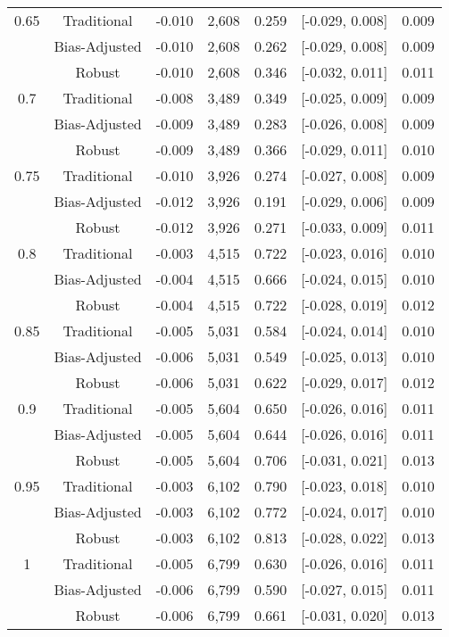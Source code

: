 \documentclass[
  12pt,
]{article}
\begin{document}
\begin{longtable}[t]{ccccccc}
0.65 & Traditional & -0.010 & 2,608 & 0.259 & {}[-0.029, 0.008] & 0.009\\
 & Bias-Adjusted & -0.010 & 2,608 & 0.262 & {}[-0.029, 0.008] & 0.009\\
 & Robust & -0.010 & 2,608 & 0.346 & {}[-0.032, 0.011] & 0.011\\
0.7 & Traditional & -0.008 & 3,489 & 0.349 & {}[-0.025, 0.009] & 0.009\\
 & Bias-Adjusted & -0.009 & 3,489 & 0.283 & {}[-0.026, 0.008] & 0.009\\
 & Robust & -0.009 & 3,489 & 0.366 & {}[-0.029, 0.011] & 0.010\\
0.75 & Traditional & -0.010 & 3,926 & 0.274 & {}[-0.027, 0.008] & 0.009\\
 & Bias-Adjusted & -0.012 & 3,926 & 0.191 & {}[-0.029, 0.006] & 0.009\\
 & Robust & -0.012 & 3,926 & 0.271 & {}[-0.033, 0.009] & 0.011\\
0.8 & Traditional & -0.003 & 4,515 & 0.722 & {}[-0.023, 0.016] & 0.010\\
 & Bias-Adjusted & -0.004 & 4,515 & 0.666 & {}[-0.024, 0.015] & 0.010\\
 & Robust & -0.004 & 4,515 & 0.722 & {}[-0.028, 0.019] & 0.012\\
0.85 & Traditional & -0.005 & 5,031 & 0.584 & {}[-0.024, 0.014] & 0.010\\
 & Bias-Adjusted & -0.006 & 5,031 & 0.549 & {}[-0.025, 0.013] & 0.010\\
 & Robust & -0.006 & 5,031 & 0.622 & {}[-0.029, 0.017] & 0.012\\
0.9 & Traditional & -0.005 & 5,604 & 0.650 & {}[-0.026, 0.016] & 0.011\\
 & Bias-Adjusted & -0.005 & 5,604 & 0.644 & {}[-0.026, 0.016] & 0.011\\
 & Robust & -0.005 & 5,604 & 0.706 & {}[-0.031, 0.021] & 0.013\\
0.95 & Traditional & -0.003 & 6,102 & 0.790 & {}[-0.023, 0.018] & 0.010\\
 & Bias-Adjusted & -0.003 & 6,102 & 0.772 & {}[-0.024, 0.017] & 0.010\\
 & Robust & -0.003 & 6,102 & 0.813 & {}[-0.028, 0.022] & 0.013\\
1 & Traditional & -0.005 & 6,799 & 0.630 & {}[-0.026, 0.016] & 0.011\\
 & Bias-Adjusted & -0.006 & 6,799 & 0.590 & {}[-0.027, 0.015] & 0.011\\
 & Robust & -0.006 & 6,799 & 0.661 & {}[-0.031, 0.020] & 0.013\\*
\end{longtable}
\endgroup{}
\end{document}
